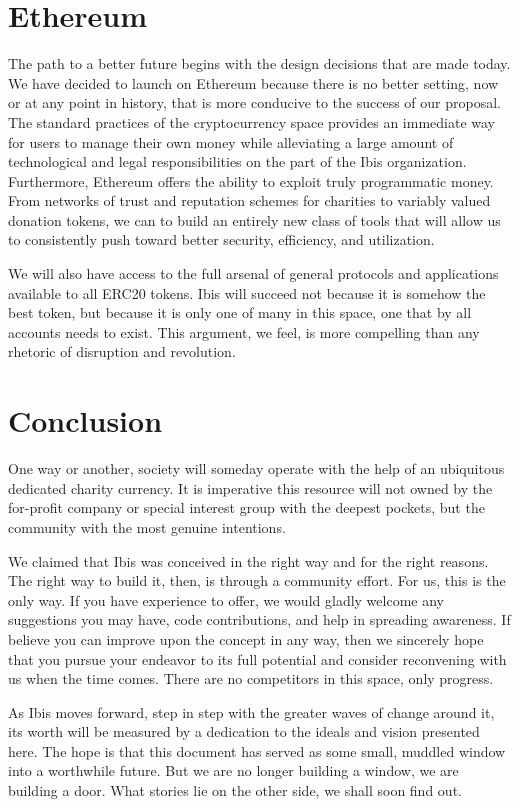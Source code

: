 \documentclass{article} \usepackage{parskip} \usepackage{titlesec}
\begin{document}
\section{Ethereum}

The path to a better future begins with the design decisions that are made
today. We have decided to launch on Ethereum because there is no better setting,
now or at any point in history, that is more conducive to the success of our
proposal. The standard practices of the cryptocurrency space provides an
immediate way for users to manage their own money while alleviating a large
amount of technological and legal responsibilities on the part of the Ibis
organization. Furthermore, Ethereum offers the ability to exploit truly
programmatic money. From networks of trust and reputation schemes for charities
to variably valued donation tokens, we can to build an entirely new class of
tools that will allow us to consistently push toward better security,
efficiency, and utilization.

We will also have access to the full arsenal of general protocols and
applications available to all ERC20 tokens. Ibis will succeed not because it is
somehow the best token, but because it is only one of many in this space, one
that by all accounts needs to exist. This argument, we feel, is more compelling
than any rhetoric of disruption and revolution.

\section{Conclusion}

One way or another, society will someday operate with the help of an ubiquitous
dedicated charity currency. It is imperative this resource will not owned by the
for-profit company or special interest group with the deepest pockets, but the
community with the most genuine intentions.

We claimed that Ibis was conceived in the right way and for the right
reasons. The right way to build it, then, is through a community effort. For us,
this is the only way. If you have experience to offer, we would gladly welcome
any suggestions you may have, code contributions, and help in spreading
awareness. If believe you can improve upon the concept in any way, then we
sincerely hope that you pursue your endeavor to its full potential and consider
reconvening with us when the time comes. There are no competitors in this
space, only progress.

As Ibis moves forward, step in step with the greater waves of change around it,
its worth will be measured by a dedication to the ideals and vision presented
here. The hope is that this document has served as some small, muddled window
into a worthwhile future. But we are no longer building a window, we are
building a door. What stories lie on the other side, we shall soon find out.
\end{document}
